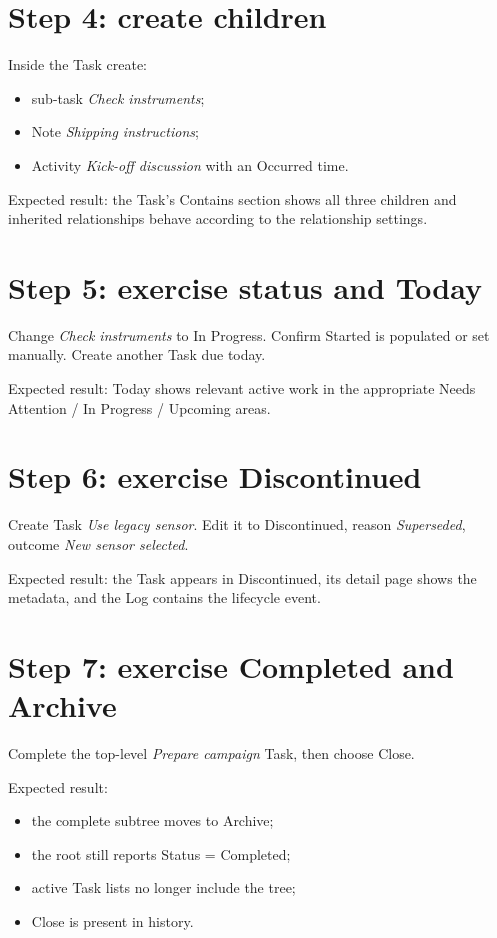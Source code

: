 \documentclass{testudomanual}
\begin{document}
\section{Step 4: create children}

Inside the Task create:
\begin{itemize}
    \item sub-task \emph{Check instruments};
    \item Note \emph{Shipping instructions};
    \item Activity \emph{Kick-off discussion} with an Occurred time.
\end{itemize}

Expected result: the Task's Contains section shows all three children and inherited relationships behave according to the relationship settings.

\section{Step 5: exercise status and Today}

Change \emph{Check instruments} to In Progress. Confirm Started is populated or set manually. Create another Task due today.

Expected result: Today shows relevant active work in the appropriate Needs Attention / In Progress / Upcoming areas.

\section{Step 6: exercise Discontinued}

Create Task \emph{Use legacy sensor}. Edit it to Discontinued, reason \emph{Superseded}, outcome \emph{New sensor selected}.

Expected result: the Task appears in Discontinued, its detail page shows the metadata, and the Log contains the lifecycle event.

\section{Step 7: exercise Completed and Archive}

Complete the top-level \emph{Prepare campaign} Task, then choose Close.

Expected result:
\begin{itemize}
    \item the complete subtree moves to Archive;
    \item the root still reports Status = Completed;
    \item active Task lists no longer include the tree;
    \item Close is present in history.
\end{itemize}
\end{document}
